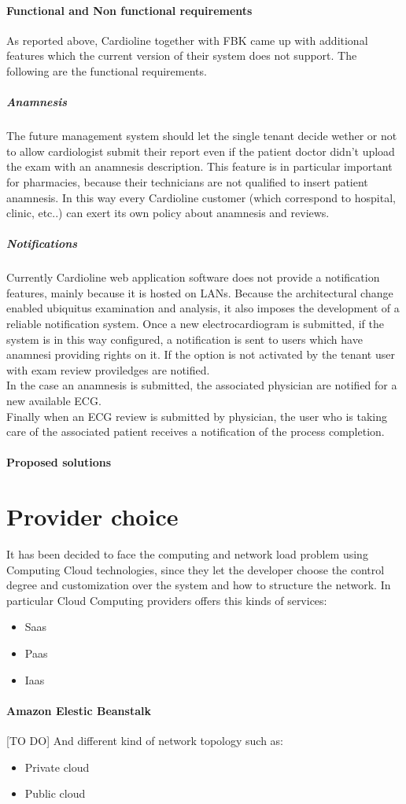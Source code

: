 \paragraph{Functional and Non functional requirements}
As reported above, Cardioline together with FBK came up with additional features which the current version of their system does not support.
The following are the functional requirements.
\subparagraph{Anamnesis}
The future management system should let the single tenant decide wether or not to allow cardiologist submit their report even if the patient doctor didn't upload the exam with an anamnesis description. This feature is in particular important for pharmacies, because their technicians are not qualified to insert patient anamnesis. In this way every Cardioline customer (which correspond to hospital, clinic, etc..) can exert its own policy about anamnesis and reviews.
\subparagraph{Notifications}
Currently Cardioline web application software does not provide a notification features, mainly because it is hosted on LANs.
Because the architectural change enabled ubiquitus examination and analysis, it also imposes the development of a reliable notification system. Once a new electrocardiogram is submitted, if the system is in this way configured, a notification is sent to users which have anamnesi providing rights on it. If the option is not activated by the tenant user with exam review proviledges are notified.\\
In the case an anamnesis is submitted, the associated physician are notified for a new available ECG.\\
Finally when an ECG review is submitted by physician, the user who is taking care of the associated patient receives a notification of the process completion.

\paragraph{Proposed solutions}


\section{Provider choice}
It has been decided to face the computing and network load problem using Computing Cloud technologies, since they let the developer choose the control degree and customization over the system and how to structure the network.
In particular Cloud Computing providers offers this kinds of services:
\begin{itemize}
    \item Saas
    \item Paas
    \item Iaas
\end{itemize}
\paragraph{Amazon Elestic Beanstalk}
\label{paragraph:amazon_elastic_beanstalk}
[TO DO]
And different kind of network topology such as:
\begin{itemize}
    \item Private cloud
    \item Public cloud
\end{itemize}

